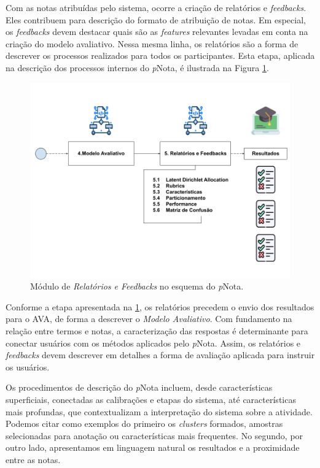 Com as notas atribuídas pelo sistema, ocorre a criação de relatórios e \textit{feedbacks}. Eles contribuem para descrição do formato de atribuição de notas. Em especial, os \textit{feedbacks} devem destacar quais são as \textit{features} relevantes levadas em conta na criação do modelo avaliativo. Nessa mesma linha, os relatórios são a forma de descrever os processos realizados para todos os participantes. Esta etapa, aplicada na descrição dos processos internos do \textit{p}Nota, é ilustrada na Figura \ref{fig-rf}. 

\begin{figure}[!h]
\centering
\includegraphics[width=\textwidth]{figuras/esquema-rf-pNota.png}
\caption{Módulo de \textit{Relatórios e Feedbacks} no esquema do \textit{p}Nota.}
\label{fig-rf}
\end{figure}


Conforme a etapa apresentada na \ref{fig-rf}, os relatórios precedem o envio dos resultados para o AVA, de forma a descrever o \textit{Modelo Avaliativo}. Com fundamento na relação entre termos e notas, a caracterização das respostas é determinante para conectar usuários com os métodos aplicados pelo \textit{p}Nota. Assim, os relatórios e \textit{feedbacks} devem descrever em detalhes a forma de avaliação aplicada para instruir os usuários.

Os procedimentos de descrição do \textit{p}Nota incluem, desde características superficiais, conectadas as calibrações e etapas do sistema, até características mais profundas, que contextualizam a interpretação do sistema sobre a atividade. Podemos citar como exemplos do primeiro os \textit{clusters} formados, amostras selecionadas para anotação ou características mais frequentes. No segundo, por outro lado, apresentamos em linguagem natural os resultados e a proximidade entre as notas.


